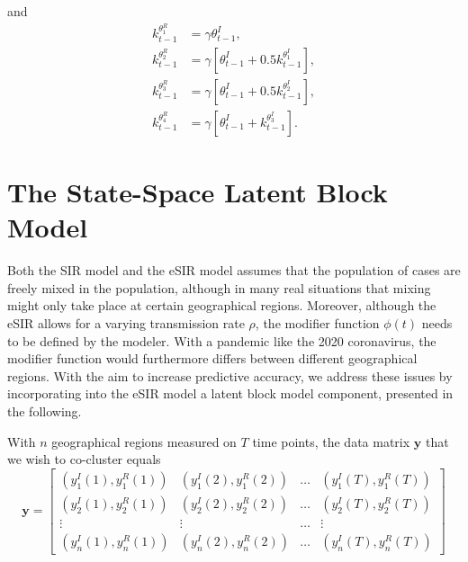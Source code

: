 \documentclass[10pt,a4paper]{article}
\begin{document}
%
and 
%
\begin{equation*}
	\begin{split}	
		k_{t-1}^{\theta^R_1} &= \gamma \theta^I_{t-1}, \\
		k_{t-1}^{\theta^R_2} &= \gamma[\theta_{t-1}^I + 0.5 k_{t-1}^{\theta^I_1}], \\
		k_{t-1}^{\theta^R_3} &= \gamma[\theta_{t-1}^I + 0.5 k_{t-1}^{\theta^I_2}], \\
		k_{t-1}^{\theta^R_4} &= \gamma[\theta_{t-1}^I + k_{t-1}^{\theta^I_3}]. 
	\end{split}
\end{equation*}
%	






\section{The State-Space Latent Block Model}
Both the SIR model and the eSIR model assumes that the population of cases are freely mixed in the population, although in many real situations that mixing might only take place at certain geographical regions. Moreover, although the eSIR allows for a varying transmission rate $\rho$, the modifier function $\phi(t)$ needs to be defined by the modeler. With a pandemic like the 2020 coronavirus, the modifier function would furthermore differs between different geographical regions. With the aim to increase predictive accuracy, we address these issues by incorporating into the eSIR model a latent block model component, presented in the following. 
 
With $n$ geographical regions measured on $T$ time points, the data matrix $\mathbf{y}$ that we wish to co-cluster equals
%
$$
\mathbf{y} = \begin{bmatrix}
	(y^I_1(1), y^R_1(1)) & (y^I_1(2), y^R_1(2)) & \ldots & (y^I_1(T), y^R_1(T))\\
	(y^I_2(1), y^R_2(1)) & (y^I_2(2), y^R_2(2)) & \ldots & (y^I_2(T), y^R_2(T))\\
	\vdots & \vdots & \ldots & \vdots \\
	(y^I_n(1), y^R_n(1)) & (y^I_n(2), y^R_n(2)) & \ldots & (y^I_n(T), y^R_n(T))
\end{bmatrix}
$$
%
\end{document}
